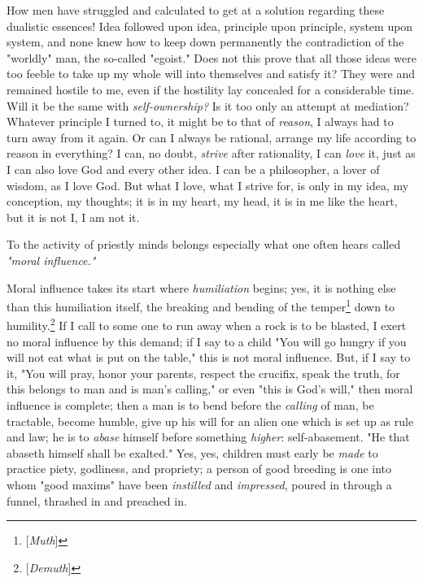How men have struggled and calculated to get at a solution regarding these 
dualistic essences! Idea followed upon idea, principle upon principle, system 
upon system, and none knew how to keep down permanently the contradiction of 
the "{}worldly"{} man, the so-called "{}egoist."{} Does not this prove that 
all those ideas were too feeble to take up my whole will into themselves and 
satisfy it? They were and remained hostile to me, even if the hostility lay 
concealed for a considerable time. Will it be the same with 
\textit{self-ownership?} Is it too only an attempt at mediation? Whatever 
principle I turned to, it might be to that of \textit{reason}, I always had to 
turn away from it again. Or can I always be rational, arrange my life 
according to reason in everything? I can, no doubt, \textit{strive} after 
rationality, I can \textit{love} it, just as I can also love God and every 
other idea. I can be a philosopher, a lover of wisdom, as I love God. But what 
I love, what I strive for, is only in my idea, my conception, my thoughts; it 
is in my heart, my head, it is in me like the heart, but it is not I, I am not 
it.

To the activity of priestly minds belongs especially what one often hears 
called \textit{"{}moral influence."{}}

Moral influence takes its start where \textit{humiliation} begins; yes, it is 
nothing else than this humiliation itself, the breaking and bending of the 
temper\footnote{[\textit{Muth}]} down to humility.\footnote{[\textit{Demuth}]} 
If I call to some one to run away when a rock is to be blasted, I exert no 
moral influence by this demand; if I say to a child "{}You will go hungry if 
you will not eat what is put on the table,"{} this is not moral influence. 
But, if I say to it, "{}You will pray, honor your parents, respect the 
crucifix, speak the truth, for this belongs to man and is man's calling,"{} or 
even "{}this is God's will,"{} then moral influence is complete; then a man is 
to bend before the \textit{calling} of man, be tractable, become humble, give 
up his will for an alien one which is set up as rule and law; he is to 
\textit{abase} himself before something \textit{higher}: self-abasement. "{}He 
that abaseth himself shall be exalted."{} Yes, yes, children must early be 
\textit{made} to practice piety, godliness, and propriety; a person of good 
breeding is one into whom "{}good maxims"{} have been \textit{instilled} and 
\textit{impressed}, poured in through a funnel, thrashed in and preached in.

